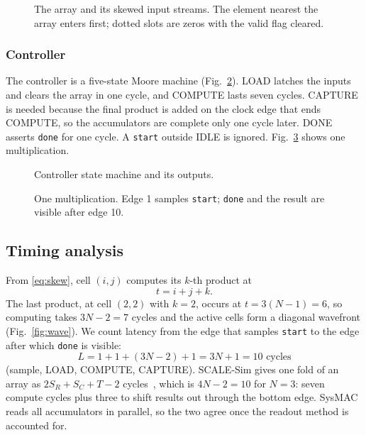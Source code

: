 \documentclass[conference]{IEEEtran}
\newcommand{\code}[1]{\texttt{#1}}
\begin{document}
\begin{figure}[t]
\centering
\resizebox{0.88\columnwidth}{!}{}
\caption{The array and its skewed input streams. The element nearest the array enters first; dotted slots are zeros with the valid flag cleared.}
\label{fig:array}
\end{figure}

\subsubsection{Controller}
The controller is a five-state Moore machine (Fig.~\ref{fig:fsm}). LOAD latches the inputs and clears the array in one cycle, and COMPUTE lasts seven cycles. CAPTURE is needed because the final product is added on the clock edge that ends COMPUTE, so the accumulators are complete only one cycle later. DONE asserts \code{done} for one cycle. A \code{start} outside IDLE is ignored. Fig.~\ref{fig:timing} shows one multiplication.

\begin{figure}[t]
\centering
\resizebox{0.85\columnwidth}{!}{}
\caption{Controller state machine and its outputs.}
\label{fig:fsm}
\end{figure}

\begin{figure}[t]
\centering
\resizebox{\columnwidth}{!}{}
\caption{One multiplication. Edge 1 samples \code{start}; \code{done} and the result are visible after edge 10.}
\label{fig:timing}
\end{figure}

\subsection{Timing analysis}
\label{sec:timing}
From \eqref{eq:skew}, cell $(i,j)$ computes its $k$-th product at
\begin{equation}
t = i + j + k .
\label{eq:when}
\end{equation}
The last product, at cell $(2,2)$ with $k = 2$, occurs at $t = 3(N-1) = 6$, so computing takes $3N - 2 = 7$ cycles and the active cells form a diagonal wavefront (Fig.~\ref{fig:wave}). We count latency from the edge that samples \code{start} to the edge after which \code{done} is visible:
\begin{equation}
L = 1 + 1 + (3N-2) + 1 = 3N + 1 = 10 \text{ cycles}
\label{eq:lat}
\end{equation}
(sample, LOAD, COMPUTE, CAPTURE). SCALE-Sim gives one fold of an array as $2S_R + S_C + T - 2$ cycles~\cite{scalesim2020}, which is $4N - 2 = 10$ for $N = 3$: seven compute cycles plus three to shift results out through the bottom edge. SysMAC reads all accumulators in parallel, so the two agree once the readout method is accounted for.
\end{document}
